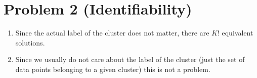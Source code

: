 \documentclass{scrartcl}
\begin{document}
  \section{Problem 2 (Identifiability)} %
  \label{sec:problem_2_identifiability_}
    \begin{enumerate}
      \item Since the actual label of the cluster does not matter, there are
        $K!$ equivalent solutions.
      \item Since we usually do not care about the label of the cluster (just the
        set of data points belonging to a given cluster) this is not a problem.
    \end{enumerate}
\end{document}
